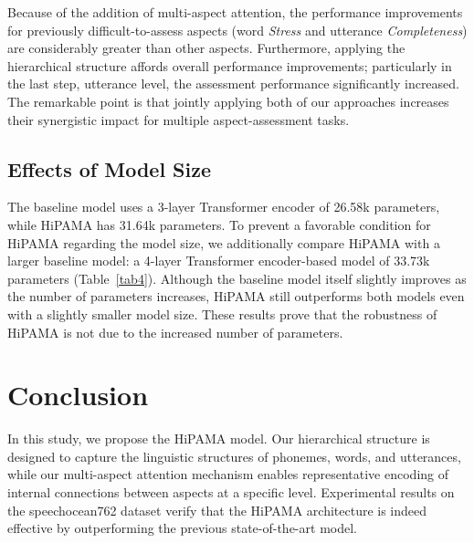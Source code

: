 \documentclass{article}
\begin{document}
Because of the addition of multi-aspect attention, the performance improvements for previously difficult-to-assess aspects (word \textit{Stress} and utterance \textit{Completeness}) are considerably greater than other aspects. Furthermore, applying the hierarchical structure affords overall performance improvements; particularly in the last step, utterance level, the assessment performance significantly increased. The remarkable point is that jointly applying both of our approaches increases their synergistic impact for multiple aspect-assessment tasks.

\subsection{Effects of Model Size}
The baseline model uses a 3-layer Transformer encoder of 26.58k parameters, while HiPAMA has 31.64k parameters. To prevent a favorable condition for HiPAMA regarding the model size, we additionally compare HiPAMA with a larger baseline model: a 4-layer Transformer encoder-based model of 33.73k parameters (Table~\ref{tab4}). Although the baseline model itself slightly improves as the number of parameters increases, HiPAMA still outperforms both models even with a slightly smaller model size. These results prove that the robustness of HiPAMA is not due to the increased number of parameters.

\begin{table}[t]
\centering
{}
\caption{\label{tab4}
Effect of the number of parameters (\# param). Because of the space limit, only the average score of the aspects has been reported for each granularity.}
\end{table}

\section{Conclusion}
In this study, we propose the HiPAMA model. Our hierarchical structure is designed to capture the linguistic structures of phonemes, words, and utterances, while our multi-aspect attention mechanism enables representative encoding of internal connections between aspects at a specific level. Experimental results on the speechocean762 dataset verify that the HiPAMA architecture is indeed effective by outperforming the previous state-of-the-art model.
\end{document}
